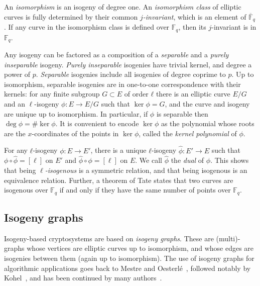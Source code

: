 \documentclass{llncs}
\newcommand{\F}{\mathbb{F}}
\newcommand{\Fbar}{\overline{\mathbb{F}}}
\begin{document}
An \emph{isomorphism} is an isogeny of degree one.
An \emph{isomorphism class} of elliptic curves is
fully determined by their common \emph{$j$-invariant}, which is an
element of $\Fbar_q$. If any curve in the isomorphism class is defined
over $\F_q$, then its $j$-invariant is in $\F_q$.

Any isogeny can be factored as a composition of a \emph{separable} and
a \emph{purely inseparable} isogeny. \emph{Purely inseparable}
isogenies have trivial kernel, and degree a power of $p$.
\emph{Separable} isogenies include all
isogenies of degree coprime to $p$.
Up to isomorphism, separable isogenies
are in one-to-one correspondence with their kernels:
for any finite subgroup $G⊂E$ of order $ℓ$ there is 
an elliptic curve $E/G$ and an $\ell$-isogeny $\phi: E \to E/G$
such that $\ker \phi = G$,
and the curve and isogeny are unique up to isomorphism.
In particular, if $\phi$ is separable then $\deg ϕ=\#\ker ϕ$.
It is convenient to encode $\ker\phi$ as
the polynomial whose roots are the $x$-coordinates of the points
in $\ker\phi$, called the \emph{kernel polynomial} of $\phi$.

For any $ℓ$-isogeny $ϕ:E→E'$, there is a unique $ℓ$-isogeny
$\hat{ϕ}:E'→E$ such that $ϕ∘\hat{ϕ} = [\ell]$ on $E'$
and $\hat{ϕ}∘ϕ = [\ell]$ on $E$.
We call $\hat{ϕ}$ the \emph{dual} of $ϕ$. This
shows that being \emph{$\ell$-isogenous} is a symmetric
relation, and that being isogenous is an equivalence relation.
 Further, a theorem of Tate states that two curves are
isogenous over $\F_q$ if and only if they have the same number of
points over $\F_q$.


\subsection{Isogeny graphs}
\label{sec:isogeny-graphs}

Isogeny-based cryptosystems are based on \emph{isogeny graphs}.
These are
(multi)-graphs whose vertices are
elliptic curves up to isomorphism, and whose edges are isogenies
between them (again up to isomorphism).
The use of isogeny graphs for algorithmic applications 
goes back to Mestre and Oesterlé~\cite{Mestre},
followed notably by Kohel~\cite{kohel},
and has been continued by many
authors~\cite{Gal,fouquet+morain02,GHS,MiretMSTV06,jao+miller+venkatesan09}.
\end{document}
